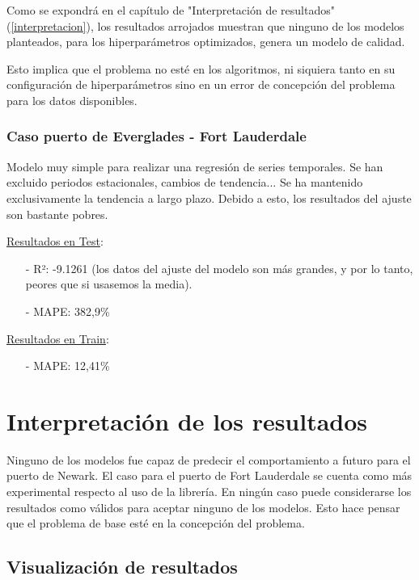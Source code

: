 \documentclass[12pt]{article}
\begin{document}
	Como se expondrá en el capítulo de "Interpretación de resultados" (\ref{interpretacion}), los resultados arrojados muestran que ninguno de los modelos planteados, para los hiperparámetros optimizados, genera un modelo de calidad.

	Esto implica que el problema no esté en los algoritmos, ni siquiera tanto en su configuración de hiperparámetros sino en un error de concepción del problema para los datos disponibles.
	
	\subsubsection{\label{evalFL} Caso puerto de Everglades - Fort Lauderdale}
	Modelo muy simple para realizar una regresión de series temporales. Se han excluido periodos estacionales, cambios de tendencia... Se ha mantenido exclusivamente la tendencia a largo plazo. Debido a esto, los resultados del ajuste son bastante pobres.
	
	\underline{Resultados en Test}: \\
	\begin{itemize}
		\item[-] R²: -9.1261 (los datos del ajuste del modelo son más grandes, y por lo tanto, peores que si usasemos la media).
		\item[-] MAPE: 382,9\%
	\end{itemize}

	\underline{Resultados en Train}: \\
	\begin{itemize}
		\item[-] MAPE: 12,41\%
	\end{itemize}
	
	

\newpage
\section{\label{interpretacion}Interpretación de los resultados}
Ninguno de los modelos fue capaz de predecir el comportamiento a futuro para el puerto de Newark. El caso para el puerto de Fort Lauderdale se cuenta como más experimental respecto al uso de la librería. En ningún caso puede considerarse los resultados como válidos para aceptar ninguno de los modelos. Esto hace pensar que el problema de base esté en la concepción del problema.

	\subsection{Visualización de resultados}
	
\end{document}
